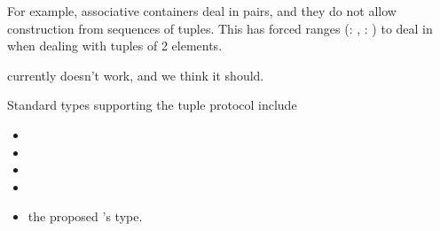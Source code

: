 \documentclass{wg21}
\begin{document}
For example, associative containers deal in pairs, and they do not allow construction from sequences of tuples. This has forced ranges (: , : ) to deal in  when dealing with tuples of 2 elements.

 currently doesn't work, and we think it should.


%
%
%
Standard types supporting the tuple protocol include

\begin{itemize}
\item {}
\item {}
\item {}
\item {}
\item the proposed 's  type.
\end{itemize}

%
\end{document}
